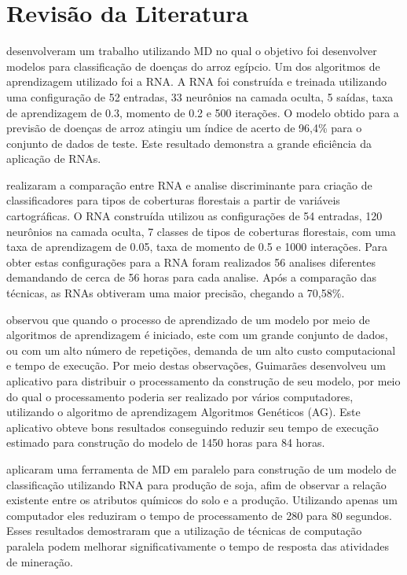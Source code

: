 \chapter{Revisão da Literatura}
 desenvolveram um trabalho utilizando MD no qual o objetivo foi desenvolver modelos para classificação de doenças do arroz egípcio. Um dos algoritmos de aprendizagem utilizado foi a RNA. A RNA foi construída e treinada utilizando uma configuração de 52 entradas, 33 neurônios na camada oculta, 5 saídas, taxa de aprendizagem de 0.3, momento de 0.2 e 500 iterações. O modelo obtido para a previsão de doenças de arroz atingiu um índice de acerto de 96,4\% para o conjunto de dados de teste. Este resultado demonstra a grande eficiência da aplicação de RNAs.

 realizaram a comparação entre RNA e analise discriminante para criação de classificadores para tipos de coberturas florestais a partir de variáveis cartográficas. O RNA construída utilizou as configurações de 54 entradas, 120 neurônios na camada oculta, 7 classes de tipos de coberturas florestais, com uma taxa de aprendizagem de 0.05, taxa de momento de 0.5 e 1000 interações. Para obter estas configurações para a RNA foram realizados 56 analises diferentes demandando de cerca de 56 horas para cada analise. Após a comparação das técnicas, as RNAs obtiveram uma maior precisão, chegando a 70,58\%.

 observou que quando o processo de aprendizado de um modelo por meio de algoritmos de aprendizagem é iniciado, este com um grande conjunto de dados, ou com um alto número de repetições, demanda de um alto custo computacional e tempo de execução. Por meio destas observações, Guimarães desenvolveu um aplicativo para distribuir o processamento da construção de seu modelo, por meio do qual o processamento poderia ser realizado por vários computadores, utilizando o algoritmo de aprendizagem Algoritmos Genéticos (AG). Este aplicativo obteve bons resultados conseguindo reduzir seu tempo de execução estimado para construção do modelo de 1450 horas para 84 horas.

 aplicaram uma ferramenta de MD em paralelo para construção de um modelo de classificação utilizando RNA para produção de soja, afim de observar a relação existente entre os atributos químicos do solo e a produção. Utilizando apenas um computador eles reduziram o tempo de processamento de 280 para 80 segundos. Esses resultados demostraram que a utilização de técnicas de computação paralela podem melhorar significativamente o tempo de resposta das atividades de mineração.
\clearpage

